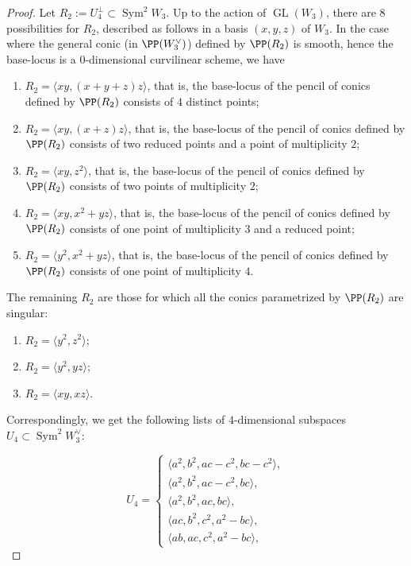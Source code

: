 \documentclass[JEP,XML,SOM,Unicode, NoEqCountersInSection,NoFloatCountersInSection]{cedram}
\newenvironment{enumeratea}
{\bgroup\def\theenumi{\alph{enumi}}\def\theenumii{\arabic{enumii}}\begin{enumerate}}
{\end{enumerate}\egroup}
\theoremstyle{definition}
\let\la\langle
\let\ra\rangle
\DeclareMathOperator{\GL}{GL}
\DeclareMathOperator{\Sym}{Sym}
\begin{document}
\begin{proof}
Let $R_2:=U_4^{\bot}\subset \Sym^2 \!W_3$. Up to the action of $\GL(W_3)$, there are $8$ possibilities for $R_2$, described as follows in a basis $(x,y,z)$ of $W_3$. In the case where the general conic (in $\PP(W^{\vee}_3)$) defined by $\PP(R_2)$ is smooth, hence the base-locus is a $0$-dimensional curvilinear scheme, we have
\begin{enumerate}
\item
$R_2=\la xy,(x+y+z)z\ra$, that is, the base-locus of the pencil of conics defined by $\PP(R_2)$ consists of $4$ distinct points;
\item
$R_2=\la xy,(x+z)z\ra$, that is, the base-locus of the pencil of conics defined by $\PP(R_2)$ consists of two reduced points and a point of multiplicity $2$;
\item
$R_2=\la xy,z^2\ra$, that is, the base-locus of the pencil of conics defined by $\PP(R_2)$ consists of two points of multiplicity $2$;
\item
$R_2=\la xy,x^2+yz\ra$, that is, the base-locus of the pencil of conics defined by $\PP(R_2)$ consists of one point of multiplicity $3$ and a reduced point;
\item
$R_2=\la y^2,x^2+yz\ra$, that is, the base-locus of the pencil of conics defined by $\PP(R_2)$ consists of one point of multiplicity $4$.
\end{enumerate}
The remaining $R_2$ are those for which all the conics parametrized by $\PP(R_2)$ are singular:
\begin{enumeratea}
\item
$R_2=\la y^2,z^2\ra$;
\item
$R_2=\la y^2,y z\ra$;
\item
$R_2=\la xy,xz\ra$.
\end{enumeratea}
\noindent
Correspondingly, we get the following lists of $4$-dimensional subspaces $U_4\subset \Sym^2 \!W^{\vee}_3$:
\par\noindent
\begin{minipage}[m]{.5\textwidth}
\begin{equation}\label{primocaso}
U_4=
\begin{cases}
\la a^2,b^2,ac-c^2,bc-c^2\ra, \\
\la a^2,b^2,ac-c^2,bc\ra, \\
\la a^2,b^2,ac,bc\ra, \\
\la ac,b^2,c^2,a^2-bc\ra, \\
\la ab,ac,c^2,a^2-bc\ra,
\end{cases}
\end{equation}

\end{minipage}
\end{proof}
\end{document}
